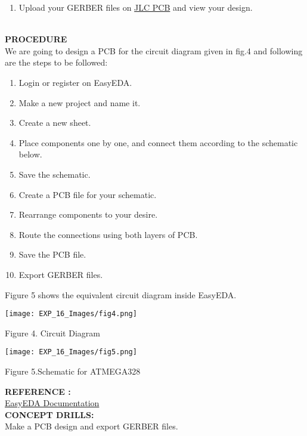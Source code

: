 \documentclass[12pt,a4paper]{article}
\begin{document}
\begin{justify}
\begin{enumerate}
  \item Upload your GERBER files on \href{https://jlcpcb.com/}{JLC PCB} and view your design.
\end{enumerate}

\\[14pt]
\noindent \textbf{\large PROCEDURE}\\[6pt]
We are going to design a PCB for the circuit diagram given in fig.4 and following are the steps to be followed:
\vspace{-6mm}
\begin{enumerate}
\setlength\itemsep{-0.3em}
\item Login or register on EasyEDA.
\item Make a new project and name it.
\item Create a new sheet.
\item Place components one by one, and connect them according to the schematic below.
\item Save the schematic.
\item Create a PCB file for your schematic.
\item Rearrange components to your desire.
\item Route the connections using both layers of PCB.
\item Save the PCB file.
\item Export GERBER files.
\end{enumerate}

Figure 5 shows the equivalent circuit diagram inside EasyEDA.

\begin{center} 
\texttt{[image: EXP\_16\_Images/fig4.png]}
\end{center}
\begin{center} {Figure 4. Circuit Diagram}\end{center}


\begin{center} 
\texttt{[image: EXP\_16\_Images/fig5.png]}
\end{center}
\begin{center} {Figure 5.Schematic for ATMEGA328}\end{center}


\setlength{\parindent}{0eM}
\textbf{\large REFERENCE :}\\
\href{https://docs.easyeda.com/}{EasyEDA Documentation}\\ [9pt]
\noindent \textbf{\large CONCEPT DRILLS:}\\
Make a PCB design and export GERBER files.
\end{justify}
\end{document}
